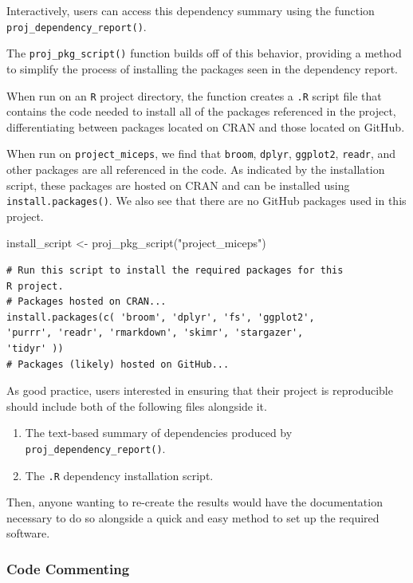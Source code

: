\documentclass[12pt,twoside]{reedthesis}
\newenvironment{Shaded}{\begin{snugshade}}{\end{snugshade}}
\newcommand{\FunctionTok}[1]{\textcolor[rgb]{0.00,0.00,0.00}{#1}}
\newcommand{\NormalTok}[1]{#1}
\newcommand{\OtherTok}[1]{\textcolor[rgb]{0.56,0.35,0.01}{#1}}
\newcommand{\StringTok}[1]{\textcolor[rgb]{0.31,0.60,0.02}{#1}}
\providecommand{\tightlist}{%
  \setlength{\itemsep}{0pt}\setlength{\parskip}{0pt}}
\begin{document}
Interactively, users can access this dependency summary using the function \texttt{proj\_dependency\_report()}.

The \texttt{proj\_pkg\_script()} function builds off of this behavior, providing a method to simplify the process of installing the packages seen in the dependency report.

When run on an \texttt{R} project directory, the function creates a \texttt{.R} script file that contains the code needed to install all of the packages referenced in the project, differentiating between packages located on CRAN and those located on GitHub.

When run on \texttt{project\_miceps}, we find that \texttt{broom}, \texttt{dplyr}, \texttt{ggplot2}, \texttt{readr}, and other packages are all referenced in the code. As indicated by the installation script, these packages are hosted on CRAN and can be installed using \texttt{install.packages()}. We also see that there are no GitHub packages used in this project.
\begin{Shaded}
\begin{Highlighting}[]
\NormalTok{install\_script }\OtherTok{\textless{}{-}} \FunctionTok{proj\_pkg\_script}\NormalTok{(}\StringTok{"project\_miceps"}\NormalTok{)}
\end{Highlighting}
\end{Shaded}
\begin{verbatim}
# Run this script to install the required packages for this
R project.
# Packages hosted on CRAN...
install.packages(c( 'broom', 'dplyr', 'fs', 'ggplot2',
'purrr', 'readr', 'rmarkdown', 'skimr', 'stargazer',
'tidyr' ))
# Packages (likely) hosted on GitHub...
\end{verbatim}
As good practice, users interested in ensuring that their project is reproducible should include both of the following files alongside it.
\begin{enumerate}
\def\labelenumi{\arabic{enumi}.}
\tightlist
\item
  The text-based summary of dependencies produced by \texttt{proj\_dependency\_report()}.
\item
  The \texttt{.R} dependency installation script.
\end{enumerate}
Then, anyone wanting to re-create the results would have the documentation necessary to do so alongside a quick and easy method to set up the required software.

\hypertarget{code-commenting}{%
\subsubsection{Code Commenting}\label{code-commenting}}
\end{document}
